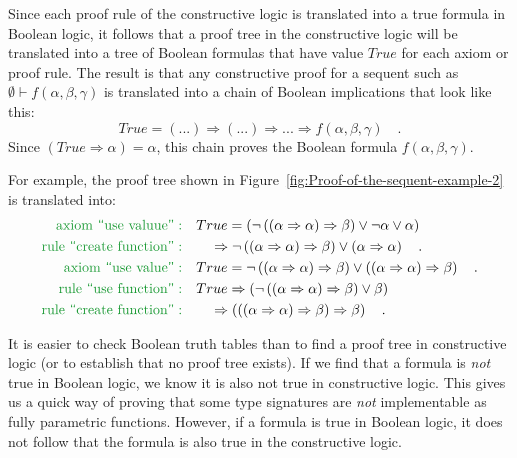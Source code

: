 Since each proof rule of the constructive logic is translated into
a true formula in Boolean logic, it follows that a proof tree in the
constructive logic will be translated into a tree of Boolean formulas
that have value $True$ for each axiom or proof rule. The result is
that any constructive proof for a sequent such as $\emptyset\vdash f(\alpha,\beta,\gamma)$
is translated into a chain of Boolean implications that look like
this:
\[
True=(...)\Rightarrow(...)\Rightarrow...\Rightarrow f(\alpha,\beta,\gamma)\quad.
\]
Since $\left(True\Rightarrow\alpha\right)=\alpha$, this chain proves
the Boolean formula $f(\alpha,\beta,\gamma)$.

For example, the proof tree shown in Figure~\ref{fig:Proof-of-the-sequent-example-2}
is translated into:
\begin{align*}
{\color{greenunder}\text{axiom \textsf{``}use valuue\textsf{''}}:}\quad & True=\left(\neg\left(\left(\alpha\Rightarrow\alpha\right)\Rightarrow\beta\right)\vee\neg\alpha\vee\alpha\right)\\
{\color{greenunder}\text{rule \textsf{``}create function\textsf{''}}:}\quad & \quad\Rightarrow\neg\left(\left(\alpha\Rightarrow\alpha\right)\Rightarrow\beta\right)\vee\left(\alpha\Rightarrow\alpha\right)\quad.\\
{\color{greenunder}\text{axiom \textsf{``}use value\textsf{''}}:}\quad & True=\neg\left(\left(\alpha\Rightarrow\alpha\right)\Rightarrow\beta\right)\vee\left(\left(\alpha\Rightarrow\alpha\right)\Rightarrow\beta\right)\quad.\\
{\color{greenunder}\text{rule \textsf{``}use function\textsf{''}}:}\quad & True\Rightarrow\left(\neg\left(\left(\alpha\Rightarrow\alpha\right)\Rightarrow\beta\right)\vee\beta\right)\\
{\color{greenunder}\text{rule \textsf{``}create function\textsf{''}}:}\quad & \quad\Rightarrow\left(\left(\left(\alpha\Rightarrow\alpha\right)\Rightarrow\beta\right)\Rightarrow\beta\right)\quad.
\end{align*}

It is easier to check Boolean truth tables than to find a proof tree
in constructive logic (or to establish that no proof tree exists).
If we find that a formula is \emph{not} true in Boolean logic, we
know it is also not true in constructive logic. This gives us a quick
way of proving that some type signatures are \emph{not} implementable
as fully parametric functions. However, if a formula is true in Boolean
logic, it does not follow that the formula is also true in the constructive
logic.

